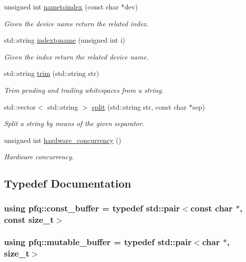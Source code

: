 \begin{DoxyCompactItemize}
unsigned int \hyperlink{namespacepfq_a55d90c336462015bb2b4e40f9f853847}{nametoindex} (const char $\ast$dev)
\begin{DoxyCompactList}\small\item\em Given the device name return the related index. \end{DoxyCompactList}\item 
std\+::string \hyperlink{namespacepfq_a7bf753b90ae15e20c86f40ba59c87c36}{indextoname} (unsigned int i)
\begin{DoxyCompactList}\small\item\em Given the index return the related device name. \end{DoxyCompactList}\item 
std\+::string \hyperlink{namespacepfq_a02a1861a64cc518394d3cc4361799c9f}{trim} (std\+::string str)
\begin{DoxyCompactList}\small\item\em Trim pending and trailing whitespaces from a string. \end{DoxyCompactList}\item 
std\+::vector$<$ std\+::string $>$ \hyperlink{namespacepfq_a0c3aeb61dfd544cb08cb240202caf213}{split} (std\+::string str, const char $\ast$sep)
\begin{DoxyCompactList}\small\item\em Split a string by means of the given separator. \end{DoxyCompactList}\item 
unsigned int \hyperlink{namespacepfq_a9a9e9be8b77976ed45483448f54de1f9}{hardware\+\_\+concurrency} ()
\begin{DoxyCompactList}\small\item\em Hardware concurrency. \end{DoxyCompactList}\end{DoxyCompactItemize}


\subsection{Typedef Documentation}
\hypertarget{namespacepfq_ac835a1bd09b4cbaba61c100b50d0a99f}{
\subsubsection[{const\+\_\+buffer}]{\setlength{\rightskip}{0pt plus 5cm}using {\bf pfq\+::const\+\_\+buffer} = typedef std\+::pair$<$const char $\ast$, const size\+\_\+t$>$}}\label{namespacepfq_ac835a1bd09b4cbaba61c100b50d0a99f}
\hypertarget{namespacepfq_ad7b88920eaf729154354741132483ea8}{
\subsubsection[{mutable\+\_\+buffer}]{\setlength{\rightskip}{0pt plus 5cm}using {\bf pfq\+::mutable\+\_\+buffer} = typedef std\+::pair$<$char $\ast$, size\+\_\+t$>$}}\label{namespacepfq_ad7b88920eaf729154354741132483ea8}


